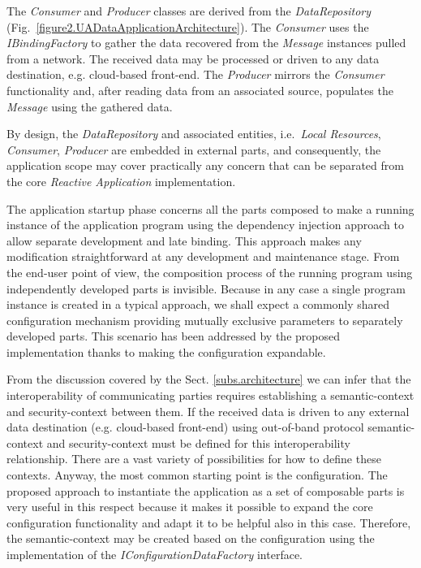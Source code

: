 \documentclass{article}
\begin{document}
The \textit{Consumer} and \textit{Producer} classes are derived from the \textit{DataRepository} (Fig.~\ref*{figure2.UADataApplicationArchitecture}). The \textit{Consumer} uses the \textit{IBindingFactory} to gather the data recovered from the \emph{Message} instances pulled from a network. The received data may be processed or driven to any data destination, e.g. cloud-based front-end. The \textit{Producer} mirrors the \textit{Consumer} functionality and, after reading data from an associated source, populates the \emph{Message} using the gathered data.

By design, the \textit{DataRepository} and associated entities, i.e.~\textit{Local Resources}, \textit{Consumer}, \textit{Producer} are embedded in external parts, and consequently, the application scope may cover practically any concern that can be separated from the core \textit{Reactive Application} implementation.

The application startup phase concerns all the parts composed to make a running instance of the application program using the dependency injection approach to allow separate development and late binding. This approach makes any modification straightforward at any development and maintenance stage. From the end-user point of view, the composition process of the running program using independently developed parts is invisible. Because in any case a single program instance is created in a typical approach, we shall expect a commonly shared configuration mechanism providing mutually exclusive parameters to separately developed parts. This scenario has been addressed by the proposed implementation thanks to making the configuration expandable.

From the discussion covered by the Sect. \ref*{subs.architecture} we can infer that the interoperability of communicating parties requires establishing a semantic-context and security-context between them. If the received data is driven to any external data destination (e.g. cloud-based front-end) using out-of-band protocol semantic-context and security-context must be defined for this interoperability relationship. There are a vast variety of possibilities for how to define these contexts. Anyway, the most common starting point is the configuration. The proposed approach to instantiate the application as a set of composable parts is very useful in this respect because it makes it possible to expand the core configuration functionality and adapt it to be helpful also in this case. Therefore, the semantic-context may be created based on the configuration using the implementation of the \textit{IConfigurationDataFactory} interface.
\end{document}
